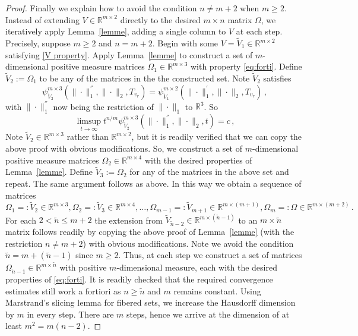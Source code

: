 \documentclass[10pt]{amsart}
\theoremstyle{definition}
\newcommand{\R}{\mathbb{R}}
\begin{document}
\begin{proof}
Finally we explain how to avoid the condition $n\ne m+2$ when $m\ge 2$. Instead of extending $V\in \R^{m\times 2}$ directly to the desired $m\times n$ matrix $\Omega$, we iteratively apply Lemma~\ref{lemme}, adding a single column to $V$ at each step. Precisely, suppose $m\geq 2$ and $n=m+2$. Begin with some $V=\tilde{V}_{1}\in\R^{m\times 2}$ satisfying \eqref{V property}. Apply Lemma~\ref{lemme} to construct a set of $m$-dimensional positive measure matrices $\Omega_{1}\in \R^{m\times 3}$ with property \eqref{eq:forti}. Define $\tilde{V}_{2}:=\Omega_{1}$ to be any of the matrices in the the constructed set. Note $\tilde{V}_{2}$ satisfies
\begin{equation*}
\psi_{\tilde{V}_{2}}^{m\times 3}(\|\cdot\|^{''}_{1},\|\cdot\|_{2},T_{v_{r}})=\psi_{\tilde{V}_{1}}^{m\times 2}(\|\cdot\|^{'}_{1},\|\cdot\|_{2},T_{v_{r}})\, ,
\end{equation*}
with $\|\cdot\|^{''}_{1}$ now being the restriction of $\|\cdot\|_{1}$ to $\R^{3}$. So
\begin{equation*}
    \limsup_{t\to\infty} t^{n/m}\psi_{\tilde{V}_{2}}^{m\times 3}(\|\cdot\|^{''}_{1},\|\cdot\|_{2},t)=c\, ,
\end{equation*}
Note $\tilde{V}_{2}\in\R^{m\times 3}$ rather than $\R^{m\times 2}$, but it is readily verified that we can copy the above proof with obvious modifications. So, we construct a set of $m$-dimensional positive measure matrices $\Omega_{2}\in \R^{m\times 4}$ with the desired properties of Lemma~\ref{lemme}. Define $\tilde{V}_{3}:=\Omega_{2}$ for any of the matrices in the above set and repeat. The same argument follows as above. In this way we obtain a sequence of matrices  
\begin{equation*}
    \Omega_{1}=: \tilde{V}_{2} \in \R^{m\times 3}, \Omega_{2}=:\tilde{V}_{3}\in \R^{m\times 4},\ldots, \Omega_{m-1}=:\tilde{V}_{m+1}\in \R^{m\times(m+1)},\Omega_{m}=:\Omega\in \R^{m\times (m+2)}\, .
\end{equation*}    
    For each $2< \tilde{n} \leq m+2$ the extension from $\tilde{V}_{\tilde{n}-2} \in \R^{m\times (\tilde{n}-1)}$ to an $m\times \tilde{n}$ matrix follows readily by copying the above proof of Lemma~\ref{lemme} (with the restriction $n\neq m+2$) with obvious modifications. Note we avoid the condition $\tilde{n}= m+(\tilde{n}-1)$ since $m\geq 2$. Thus, at each step we construct a set of matrices $\Omega_{\tilde{n}-1}\in \R^{m\times \tilde{n}}$ with positive $m$-dimensional measure, each with the desired properties of \eqref{eq:forti}. It is readily checked that the required convergence estimates still work a fortiori as $n\ge \tilde{n}$ and $m$ remains constant. Using Marstrand's slicing lemma \cite{mars} for fibered sets, we increase the Hausdorff dimension by $m$ in every step. There are $m$ steps, hence we arrive at the dimension of at least $m^{2}=m(n-2)$.


\end{proof}
\end{document}

